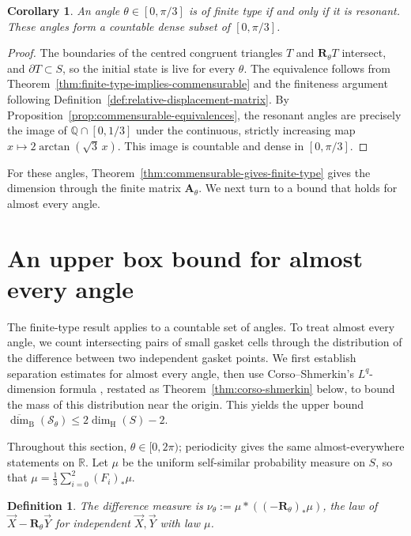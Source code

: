 \documentclass[scheme=plain]{ctexart}
\newtheorem{definition}[theorem]{Definition}
\newtheorem{corollary}[theorem]{Corollary}
\newcommand{\dimhaus}{\dim_\mathrm{H}}
\begin{document}
\begin{corollary}
\label{cor:finite-type-commensurable-dichotomy}
An angle $\theta\in[0,\pi/3]$ is of finite type if and only if it is resonant.
These angles form a countable dense subset of $[0,\pi/3]$.
\end{corollary}

\begin{proof}
The boundaries of the centred congruent triangles $T$ and $\mathbf R_\theta T$ intersect, and $\partial T\subset S$, so the initial state is live for every $\theta$.
The equivalence follows from Theorem~\ref{thm:finite-type-implies-commensurable} and the finiteness argument following Definition~\ref{def:relative-displacement-matrix}.
By Proposition~\ref{prop:commensurable-equivalences}, the resonant angles are precisely the image of $\mathbb Q\cap[0,1/3]$ under the continuous, strictly increasing map $x\mapsto2\arctan(\sqrt3\,x)$.
This image is countable and dense in $[0,\pi/3]$.
\end{proof}

For these angles, Theorem~\ref{thm:commensurable-gives-finite-type} gives the dimension through the finite matrix $\mathbf A_\theta$.
We next turn to a bound that holds for almost every angle.


\section{An upper box bound for almost every angle}
\label{sec:ae-upper}

The finite-type result applies to a countable set of angles.
To treat almost every angle, we count intersecting pairs of small gasket cells through the distribution of the difference between two independent gasket points.
We first establish separation estimates for almost every angle, then use Corso--Shmerkin's $L^q$-dimension formula \cite[Corollary~4.2]{corso2024dynamical}, restated as Theorem~\ref{thm:corso-shmerkin} below, to bound the mass of this distribution near the origin.
This yields the upper bound $\overline{\dim}_{\mathrm B}(\mathcal S_\theta)\le2\dimhaus(S)-2$.

Throughout this section, $\theta\in[0,2\pi)$; periodicity gives the same almost-everywhere statements on $\mathbb R$.
Let $\mu$ be the uniform self-similar probability measure on $S$, so that $\mu=\tfrac13\sum_{i=0}^2(F_i)_*\mu$.

\begin{definition}
The \emph{difference measure} is $\nu_\theta:=\mu*((-\mathbf R_\theta)_*\mu)$, the law of $\vec X-\mathbf R_\theta\vec Y$ for independent $\vec X,\vec Y$ with law $\mu$.
\end{definition}
\end{document}
